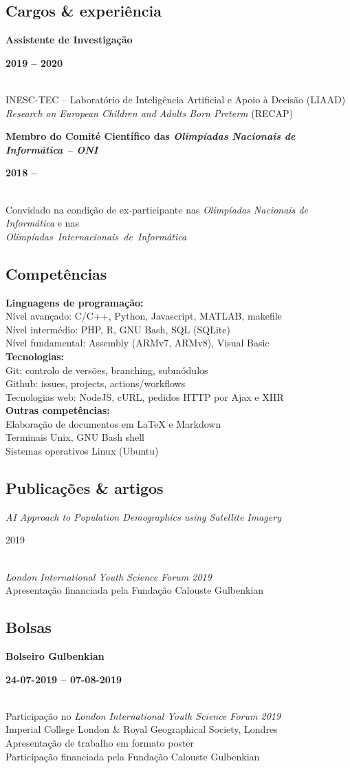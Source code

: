 \documentclass[8pt]{extarticle}
\newcommand{\parag}[1]{
\begin{minipage}{\textwidth} \hfill
\begin{minipage}{\dimexpr\textwidth-0.6cm}
	#1
\end{minipage}
\end{minipage}
}
\newcommand{\itemtime}[2]{
#1 \hfill \begin{minipage}[t]{0.185\textwidth}         #2  \end{minipage}
}
\newcommand{\job}[3]{\parag{
\itemtime{\textbf{#1}}{\textbf{#2}}\\
#3 \vspace*{9px}}}
\newcommand{\pub}[3]{\parag{
\itemtime{\textit{#1}}{#2}\\
#3 \vspace*{9px}}}
\begin{document}
\subsection*{Cargos \& experiência}
\job{Assistente de Investigação}{2019 – 2020}{
INESC-TEC – Laboratório de Inteligência Artificial e Apoio à Decisão (LIAAD)\\
\textit{Research on European Children and Adults Born Preterm} (RECAP)
}
\job{Membro do Comité Científico das \textit{Olimpíadas Nacionais de Informática – ONI}}{2018 – }{
Convidado na condição de ex-participante nas \textit{Olimpíadas Nacionais de Informática} e nas \\
\mbox{\textit{Olimpíadas Internacionais de Informática}}
}
\subsection*{Competências}
\parag{
\textbf{Linguagens de programação:}\\
Nível avançado: C/C++, Python, Javascript, MATLAB, makefile\\
Nível intermédio: PHP, R, GNU Bash, SQL (SQLite)\\
Nível fundamental: Assembly (ARMv7, ARMv8), Visual Basic\\ 
\textbf{Tecnologias:}\\
Git: controlo de versões, branching, submódulos\\
Github: issues, projects, actions/workflows\\
Tecnologias web: NodeJS, cURL, pedidos HTTP por Ajax e XHR\\
\textbf{Outras competências:}\\
Elaboração de documentos em LaTeX e Markdown\\
Terminais Unix, GNU Bash shell\\
Sistemas operativos Linux (Ubuntu)
}
\subsection*{Publicações \& artigos}
\pub{AI Approach to Population Demographics using Satellite Imagery}{2019}{
\textit{London International Youth Science Forum 2019}\\
Apresentação financiada pela Fundação Calouste Gulbenkian
}
\subsection*{Bolsas}
\job{Bolseiro Gulbenkian}{24-07-2019 – 07-08-2019}{
Participação no \textit{London International Youth Science Forum 2019}\\
Imperial College London \& Royal Geographical Society, Londres\\
Apresentação de trabalho em formato poster\\
Participação financiada pela Fundação Calouste Gulbenkian
}
\end{document}

